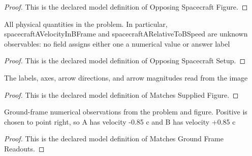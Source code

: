 \begin{proof}
  This is the declared model definition of Opposing Spacecraft Figure.
\end{proof}
\begin{definition}
  \label{def:physics:phyx-mini-0547:phyxminiproblems-problemphyxmini0547-opposingspacecraftsetup}
  All physical quantities in the problem. In particular, spacecraftAVelocityInBFrame and spacecraftARelativeToBSpeed are unknown observables: no field assigns either one a numerical value or answer label
\end{definition}
\begin{proof}
  This is the declared model definition of Opposing Spacecraft Setup.
\end{proof}
\begin{definition}
  \label{def:physics:phyx-mini-0547:phyxminiproblems-problemphyxmini0547-matchessuppliedfigure}
  The labels, axes, arrow directions, and arrow magnitudes read from the image
\end{definition}
\begin{proof}
  This is the declared model definition of Matches Supplied Figure.
\end{proof}
\begin{definition}
  \label{def:physics:phyx-mini-0547:phyxminiproblems-problemphyxmini0547-matchesgroundframereadouts}
  Ground-frame numerical observations from the problem and figure. Positive is chosen to point right, so A has velocity -0.85 c and B has velocity +0.85 c
\end{definition}
\begin{proof}
  This is the declared model definition of Matches Ground Frame Readouts.
\end{proof}
